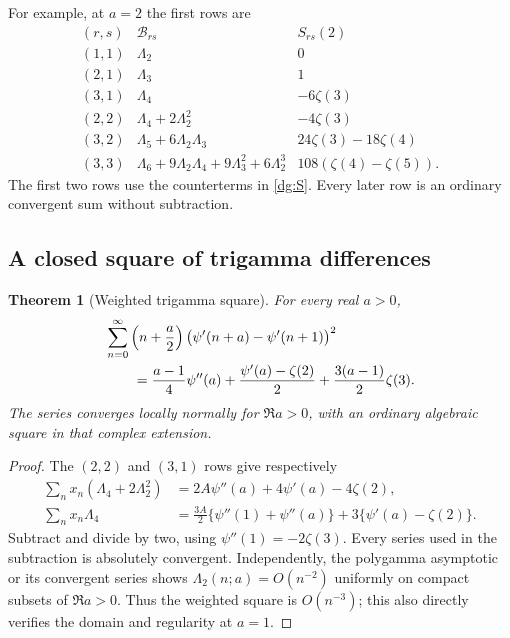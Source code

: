 \documentclass[11pt,a4paper]{article}
\numberwithin{equation}{section}
\newtheorem{theorem}{Theorem}[section]
\theoremstyle{definition}
\theoremstyle{remark}
\begin{document}
For example, at $a=2$ the first rows are
\[
\begin{array}{c|c|c}
 (r,s)&\mathcal B_{rs}&S_{rs}(2)\\\hline
 (1,1)&\Lambda_2&0\\
 (2,1)&\Lambda_3&1\\
 (3,1)&\Lambda_4&-6\zeta(3)\\
 (2,2)&\Lambda_4+2\Lambda_2^2&-4\zeta(3)\\
 (3,2)&\Lambda_5+6\Lambda_2\Lambda_3&24\zeta(3)-18\zeta(4)\\
 (3,3)&\Lambda_6+9\Lambda_2\Lambda_4+9\Lambda_3^2+6\Lambda_2^3
                                    &108(\zeta(4)-\zeta(5)).
\end{array}
\]
The first two rows use the counterterms in \eqref{dg:S}.
Every later row is an ordinary convergent sum without subtraction.

\subsection{A closed square of trigamma differences}

\begin{theorem}[Weighted trigamma square]
\label{dg:square}
For every real $a>0$,
\begin{align}
 &\sum_{n=0}^{\infty}\left(n+\frac a2\right)
       \bigl(\psi'(n+a)-\psi'(n+1)\bigr)^2\notag\\
 &\qquad=\frac{a-1}{4}\psi''(a)
     +\frac{\psi'(a)-\zeta(2)}2
     +\frac{3(a-1)}2\zeta(3).
 \label{dg:square-eq}
\end{align}
The series converges locally normally for $\Re a>0$, with an
ordinary algebraic square in that complex extension.
\end{theorem}
\begin{proof}
The $(2,2)$ and $(3,1)$ rows give respectively
\begin{align*}
 \sum_nx_n(\Lambda_4+2\Lambda_2^2)
   &=2A\psi''(a)+4\psi'(a)-4\zeta(2),\\
 \sum_nx_n\Lambda_4
   &=\frac{3A}{2}\{\psi''(1)+\psi''(a)\}
                                  +3\{\psi'(a)-\zeta(2)\}.
\end{align*}
Subtract and divide by two, using $\psi''(1)=-2\zeta(3)$.
Every series used in the subtraction is absolutely convergent.
Independently, the polygamma asymptotic or its convergent series
shows $\Lambda_2(n;a)=O(n^{-2})$ uniformly on compact subsets of
$\Re a>0$. Thus the weighted square is $O(n^{-3})$; this also
directly verifies the domain and regularity at $a=1$.
\end{proof}
\end{document}
